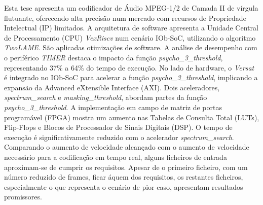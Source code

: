 \hspace{0.4cm} Esta tese apresenta um codificador de Áudio MPEG-1/2 de Camada II de vírgula flutuante, oferecendo alta precisão num mercado com recursos de Propriedade Intelectual (IP) limitados.
A arquitetura de software apresenta a Unidade Central de Processamento (CPU) \textit{VexRiscv} num cenário IOb-SoC, utilizando o algoritmo \textit{TwoLAME}. São aplicadas otimizações de software. A análise de desempenho com o periférico \textit{TIMER} destaca o impacto da função \textit{psycho\_3\_threshold}, representando 37\% a 64\% do tempo de execução.
No lado de hardware, o \textit{Versat} é integrado no IOb-SoC para acelerar a função \textit{psycho\_3\_threshold}, implicando a expansão da Advanced eXtensible Interface (AXI). Dois aceleradores, \textit{spectrum\_search} e \textit{masking\_threshold}, abordam partes da função \textit{psycho\_3\_threshold}. A implementação em campo de matriz de portas programável (FPGA) mostra um aumento nas Tabelas de Consulta Total (LUTs), Flip-Flops e Blocos de Processador de Sinais Digitais (DSP).
O tempo de execução é significativamente reduzido com o acelerador \textit{spectrum\_search}.
Comparando o aumento de velocidade alcançado com o aumento de velocidade necessário para a codificação em tempo real, alguns ficheiros de entrada aproximam-se de cumprir os requisitos. Apesar de o primeiro ficheiro, com um número reduzido de frames, ficar áquem dos requisitos, os restantes ficheiros, especialmente o que representa o cenário de pior caso, apresentam resultados promissores.
